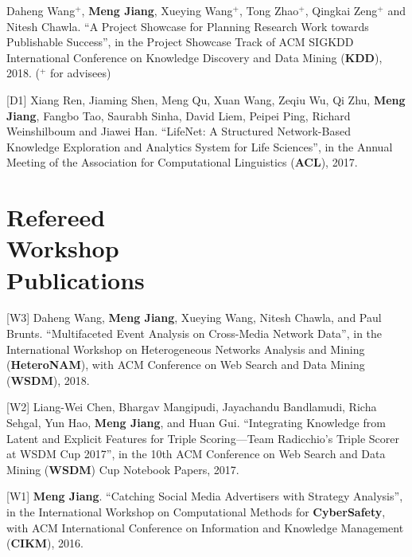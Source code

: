 \documentclass[margin, 9pt]{res}
\begin{document}
\begin{resume}
[D2] Daheng Wang${}^{+}$, \textbf{Meng Jiang}, Xueying Wang${}^{+}$, Tong Zhao${}^{+}$, Qingkai Zeng${}^{+}$ and Nitesh Chawla. ``A Project Showcase for Planning Research Work towards Publishable Success'', in the Project Showcase Track of ACM SIGKDD International Conference on Knowledge Discovery and Data Mining (\textbf{KDD}), 2018. (${}^{+}$ for advisees)

[D1] Xiang Ren, Jiaming Shen, Meng Qu, Xuan Wang, Zeqiu Wu, Qi Zhu, \textbf{Meng Jiang}, Fangbo Tao, Saurabh Sinha, David Liem, Peipei Ping, Richard Weinshilboum and Jiawei Han. ``LifeNet: A Structured Network-Based Knowledge Exploration and Analytics System for Life Sciences'', in the Annual Meeting of the Association for Computational Linguistics (\textbf{ACL}), 2017.


\section{Refereed \\ Workshop \\ Publications}

[W3] Daheng Wang, \textbf{Meng Jiang}, Xueying Wang, Nitesh Chawla, and Paul Brunts. ``Multifaceted Event Analysis on Cross-Media Network Data'', in the International Workshop on Heterogeneous Networks Analysis and Mining (\textbf{HeteroNAM}), with ACM Conference on Web Search and Data Mining (\textbf{WSDM}), 2018.

[W2] Liang-Wei Chen, Bhargav Mangipudi, Jayachandu Bandlamudi, Richa Sehgal, Yun Hao, \textbf{Meng Jiang}, and Huan Gui. ``Integrating Knowledge from Latent and Explicit Features for Triple Scoring—Team Radicchio's Triple Scorer at WSDM Cup 2017'', in the 10th ACM Conference on Web Search and Data Mining (\textbf{WSDM}) Cup Notebook Papers, 2017.

[W1] \textbf{Meng Jiang}. ``Catching Social Media Advertisers with Strategy Analysis'', in the International Workshop on Computational Methods for \textbf{CyberSafety}, with ACM International Conference on Information and Knowledge Management (\textbf{CIKM}), 2016.



\end{resume}
\end{document}
